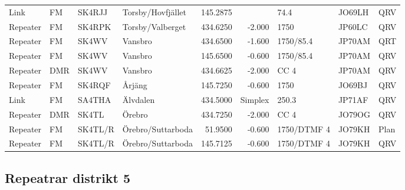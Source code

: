 \begin{landscape}
\begin{longtable}{llllrrlll}
	Link                  & FM         & SK4RJJ   & Torsby/Hovfjället      &     145.2875 &            & 74.4              & JO69LH      & QRV      \\
	Repeater              & FM         & SK4RPK   & Torsby/Valberget       &     434.6250 &     -2.000 & 1750              & JP60LC      & QRV      \\
	Repeater              & FM         & SK4WV    & Vansbro                &     434.6500 &     -1.600 & 1750/85.4         & JP70AM      & QRT      \\
	Repeater              & FM         & SK4WV    & Vansbro                &     145.6500 &     -0.600 & 1750/85.4         & JP70AM      & QRV      \\
	Repeater              & DMR        & SK4WV    & Vansbro                &     434.6625 &     -2.000 & CC 4              & JP70AM      & QRV      \\
	Repeater              & FM         & SK4RQF   & Årjäng                 &     145.7250 &     -0.600 & 1750              & JO69BJ      & QRV      \\
	Link                  & FM         & SA4THA   & Älvdalen               &     434.5000 &    Simplex & 250.3             & JP71AF      & QRV      \\
	Repeater              & DMR        & SK4TL    & Örebro                 &     434.7250 &     -2.000 & CC 4              & JO79OG      & QRV      \\
	Repeater              & FM         & SK4TL/R  & Örebro/Suttarboda      &      51.9500 &     -0.600 & 1750/DTMF 4       & JO79KH      & Plan     \\
	Repeater              & FM         & SK4TL/R  & Örebro/Suttarboda      &     145.7125 &     -0.600 & 1750/DTMF 4       & JO79KH      & QRV
\end{longtable}



\clearpage

\subsection{Repeatrar distrikt 5}


\end{landscape}
